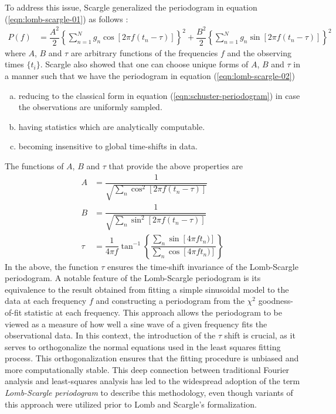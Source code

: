     			To address this issue, Scargle generalized the periodogram in equation (\ref{eqn:lomb-scargle-01}) as follows \cite{scargle1982studies}:
    			\begin{align}
    				P(f)&=\dfrac{A^2}{2}\left\lbrace \sum_{n=1}^{N}{g_n\cos{[2\pi f(t_n-\tau)]}} \right\rbrace^2 + \dfrac{B^2}{2}\left\lbrace \sum_{n=1}^{N}{g_n\sin{[2\pi f(t_n-\tau)]}} \right\rbrace^2 \label{eqn:lomb-scargle-02}
    			\end{align}
    			where $A$, $B$ and $\tau$ are arbitrary functions of the frequencies $f$ and the observing times $\{t_i\}$. Scargle also showed that one can choose unique forms of $A$, $B$ and $\tau$ in a manner such that we have the periodogram in equation (\ref{eqn:lomb-scargle-02})
    			\begin{enumerate}[a)]
    				\item reducing to the classical form in equation (\ref{eqn:schuster-periodogram}) in case the observations are uniformly sampled.
    				\item having statistics which are analytically computable.
    				\item becoming insensitive to global time-shifts in data.
    			\end{enumerate}
    			The functions of $A$, $B$ and $\tau$ that provide the above properties are
    			\begin{align*}
    				A&=\dfrac{1}{\sqrt{\sum_{n}{\cos^2{[2\pi f(t_n-\tau)]}}}} \\
    				B&=\dfrac{1}{\sqrt{\sum_{n}{\sin^2{[2\pi f(t_n-\tau)]}}}} \\
    				\tau&=\dfrac{1}{4\pi f}\tan^{-1}{\left\lbrace \dfrac{\sum_{n}{\sin{[4\pi ft_n)]}}}{\sum_{n}{\cos{[4\pi ft_n)]}}} \right\rbrace}
    			\end{align*}
    			In the above, the function $\tau$ ensures the time-shift invariance of the Lomb-Scargle periodogram. A notable feature of the Lomb-Scargle periodogram is its equivalence to the result obtained from fitting a simple sinusoidal model to the data at each frequency $f$ and constructing a periodogram from the $\chi^2$ goodness-of-fit statistic at each frequency. This approach allows the periodogram to be viewed as a measure of how well a sine wave of a given frequency fits the observational data. In this context, the introduction of the $\tau$ shift is crucial, as it serves to orthogonalize the normal equations used in the least squares fitting process. This orthogonalization ensures that the fitting procedure is unbiased and more computationally stable. This deep connection between traditional Fourier analysis and least-squares analysis has led to the widespread adoption of the term \textit{Lomb-Scargle periodogram} to describe this methodology, even though variants of this approach were utilized prior to Lomb and Scargle's formalization.
    			
